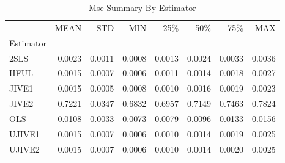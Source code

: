 \begin{table}[ht]
\centering
\caption{Mse Summary By Estimator}
\begin{tabular}{lrrrrrrr}
\toprule
 & MEAN & STD & MIN & 25\% & 50\% & 75\% & MAX \\
Estimator &  &  &  &  &  &  &  \\
\midrule
2SLS & 0.0023 & 0.0011 & 0.0008 & 0.0013 & 0.0024 & 0.0033 & 0.0036 \\
HFUL & 0.0015 & 0.0007 & 0.0006 & 0.0011 & 0.0014 & 0.0018 & 0.0027 \\
JIVE1 & 0.0015 & 0.0005 & 0.0008 & 0.0010 & 0.0016 & 0.0019 & 0.0023 \\
JIVE2 & 0.7221 & 0.0347 & 0.6832 & 0.6957 & 0.7149 & 0.7463 & 0.7824 \\
OLS & 0.0108 & 0.0033 & 0.0073 & 0.0079 & 0.0096 & 0.0133 & 0.0156 \\
UJIVE1 & 0.0015 & 0.0007 & 0.0006 & 0.0010 & 0.0014 & 0.0019 & 0.0025 \\
UJIVE2 & 0.0015 & 0.0007 & 0.0006 & 0.0010 & 0.0014 & 0.0020 & 0.0025 \\
\bottomrule
\end{tabular}
\end{table}
